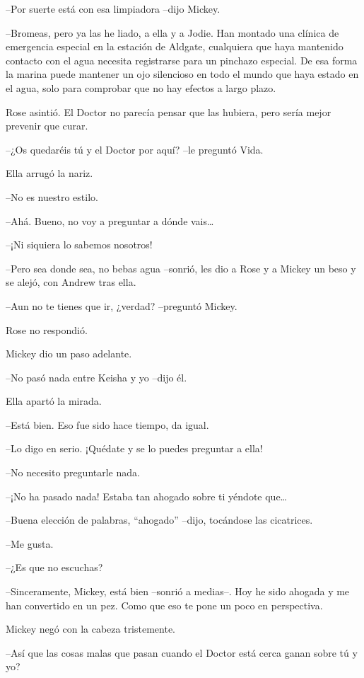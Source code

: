 {--Por suerte está con esa limpiadora --dijo Mickey.}

{--Bromeas, pero ya las he liado, a ella y a Jodie. Han montado una
 clínica de emergencia especial en la estación de Aldgate, cualquiera que
 haya mantenido contacto con el agua necesita registrarse para un
 pinchazo especial. De esa forma la marina puede mantener un ojo
 silencioso en todo el mundo que haya estado en el agua, solo para
comprobar que no hay efectos a largo plazo.}

{Rose asintió. El Doctor no parecía pensar que las hubiera, pero sería
mejor prevenir que curar.}

{--¿Os quedaréis tú y el Doctor por aquí? --le preguntó Vida.}

{Ella arrugó la nariz.}

{--No es nuestro estilo.}

{--Ahá. Bueno, no voy a preguntar a dónde vais\ldots{}}

{--¡Ni siquiera lo sabemos nosotros!}

{--Pero sea donde sea, no bebas agua --sonrió, les dio a Rose y a Mickey
un beso y se alejó, con Andrew tras ella.}

{--Aun no te tienes que ir, ¿verdad? --preguntó Mickey.}

{Rose no respondió.}

{Mickey dio un paso adelante.}

{--No pasó nada entre Keisha y yo --dijo él.}

{Ella apartó la mirada.}

{--Está bien. Eso fue sido hace tiempo, da igual.}

{--Lo digo en serio. ¡Quédate y se lo puedes preguntar a ella!}

{--No necesito preguntarle nada.}

{--¡No ha pasado nada! Estaba tan ahogado sobre ti yéndote que\ldots{}}

{--Buena elección de palabras, ``ahogado'' --dijo, tocándose las
cicatrices.}

{--Me gusta.}

{--¿Es que no escuchas?}

{--Sinceramente, Mickey, está bien --sonrió a medias--. Hoy he sido
 ahogada y me han convertido en un pez. Como que eso te pone un poco en
perspectiva.}

{Mickey negó con la cabeza tristemente.}

{--Así que las cosas malas que pasan cuando el Doctor está cerca ganan
sobre tú y yo?}

